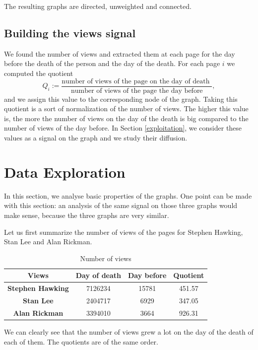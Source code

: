 \documentclass[conference]{IEEEtran}
\begin{document}
\medskip

The resulting graphs are directed, unweighted and connected. 

\subsection{Building the views signal}
We found the number of views and extracted them at each page for the day before the death of the person and the day of the death. 
For each page $i$  we computed the quotient  \[Q_i:=\frac{\text{number of views of the page on the day of death }}{\text{number of views of the page the day before}},\] and we assign this value to the corresponding node of the graph. Taking this quotient is a sort of normalization of the number of views. The higher this value is, the more the number of views on the day of the death is big compared to the number of views of the day before.  In Section \ref{exploitation}, we consider these values as a signal on the graph and we study their diffusion. 

\section{Data Exploration} \label{exploration}

In this section, we analyse basic properties of the graphs.  One point can be made with this section: an analysis of the same signal on those three graphs would make sense, because the three graphs are very similar. 

\medskip

Let us first summarize the number of views of the pages for Stephen Hawking, Stan Lee and Alan Rickman. 

\begin{table}[htbp]
\caption{Number of views}
\begin{center}
\begin{tabular}{|c|c|c|c|}
\hline
 Views & Day of death &Day before & Quotient \\
\hline
\textbf{Stephen Hawking} & 7126234 & 15781 &  451.57 \\
\hline
 \textbf{Stan Lee} &2404717 & 6929 &  347.05 \\
\hline
\textbf{Alan Rickman} & 3394010 & 3664 & 926.31 \\
\hline
\end{tabular}
\end{center}
\end{table}

We can clearly see that the number of views grew a lot on the day of the death of each of them. The quotients are of the same order.
\end{document}
